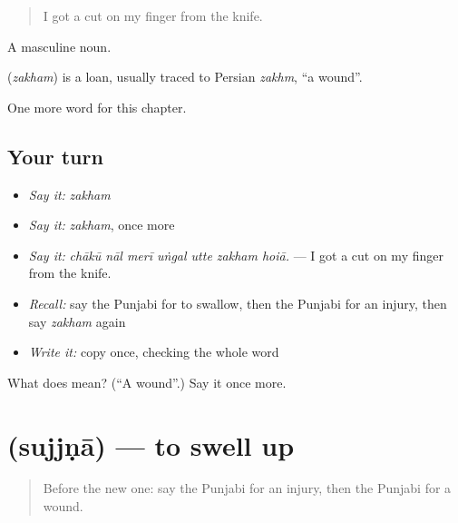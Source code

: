 \begin{quote}
I got a cut on my finger from the knife.
\end{quote}

A masculine noun.

\begin{cousinweb}
\textbf{} (\emph{zakham}) is a loan, usually traced to Persian \emph{zakhm}, \textquotedblleft{}a wound\textquotedblright{}.
\end{cousinweb}

\begin{grammarlens}[title={What you've built}]
One more word for this chapter.
\end{grammarlens}

\subsection*{Your turn}
\begin{itemize}
\raggedright
  \item \emph{Say it:} \emph{zakham}
  \item \emph{Say it:} \emph{zakham}, once more
  \item \emph{Say it:} \emph{chākū nāl merī uṅgal utte zakham hoiā.} — I got a cut on my finger from the knife.
  \item \emph{Recall:} say the Punjabi for to swallow, then the Punjabi for an injury, then say \emph{zakham} again
  \item \emph{Write it:} copy \textbf{} once, checking the whole word
\end{itemize}

\begin{tcolorbox}[breakable,colback=teal!4,colframe=teal!35!black,title={Before you move on}]
What does  mean? (\textquotedblleft{}A wound\textquotedblright{}.) Say it once more.
\end{tcolorbox}
\section[\texorpdfstring{\pa{ਸੁੱਜਣਾ} (sujjṇā)}{ਸੁੱਜਣਾ (sujjṇā)}]{ (sujjṇā) — to swell up}

\label{lesson:PA-C322-sujjna}



\begin{quote}
Before the new one: say the Punjabi for an injury, then the Punjabi for a wound.
\end{quote}

